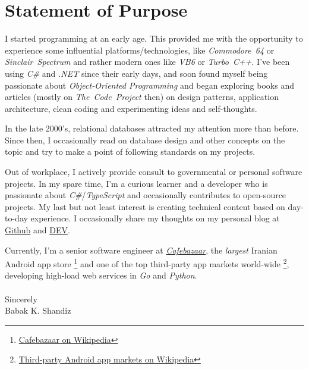 \documentclass[10pt,a4paper]{article}
\begin{document}


\section*{Statement of Purpose}

I started programming at an early age. This provided me with the opportunity
to experience some influential platforms/technologies, like
\textit{Commodore~64} or \textit{Sinclair~Spectrum} and rather modern ones
like \textit{VB6} or \textit{Turbo~C++}. I've been using \textit{C\#} and
\textit{.NET} since their early days, and soon found myself being passionate
about \textit{Object-Oriented Programming} and began exploring books and
articles (mostly on \textit{The~Code~Project} then) on design patterns,
application architecture, clean coding and experimenting ideas and
self-thoughts.

In the late 2000's, relational databases attracted my attention more than
before. Since then, I occasionally read on database design and other
concepts on the topic and try to make a point of following standards on my
projects.

Out of workplace, I actively provide consult to governmental or personal
software projects. In my spare time, I'm a curious learner and a developer who
is passionate about \textit{C\#}/\textit{TypeScript} and occasionally
contributes to open-source projects. My last but not least interest is
creating technical content based on day-to-day experience. I
occasionally share my thoughts on my personal blog at
\href{https://babakks.github.io}{Github} and
\href{https://dev.to/babakks}{DEV}.

Currently, I'm a senior software engineer at
\href{https://cafebazaar.ir}{\emph{Cafebazaar}}, the \textit{largest}
Iranian Android app store%
\footnote{\label{cb-on-wiki}%
    \href{https://en.wikipedia.org/wiki/Cafe\_Bazaar}{Cafebazaar on Wikipedia}}%
and one of the top third-party app markets world-wide%
\footnote{\label{3rd-party-stores-on-wiki}%
    \href{https://en.wikipedia.org/wiki/List\_of\_mobile\_app\_distribution\_platforms\#Third-party\_platforms}%
    {Third-party Android app markets on Wikipedia}},
developing high-load web services in \textit{Go} and \textit{Python}.
\\
\\
\noindent
Sincerely \\
\noindent
Babak K. Shandiz
\end{document}
